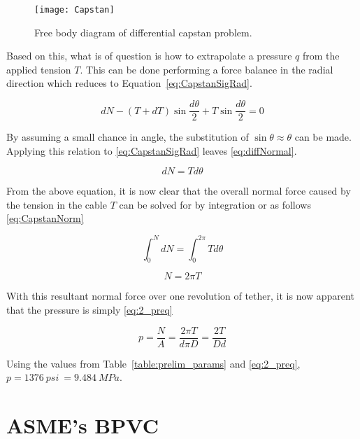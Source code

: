 \begin{figure}[!htbp]
	\centering
	\texttt{[image: Capstan]}
	\caption{Free body diagram of differential capstan problem.}
	\label{fig:Capstan}
\end{figure}

Based on this, what is of question is how to extrapolate a pressure $q$ from the applied tension $T$. This can be done performing a force balance in the radial direction which reduces to Equation~\ref{eq:CapstanSigRad}.

\begin{equation}
	\label{eq:CapstanSigRad}
	dN-(T+dT)\sin \frac{d\theta}{2}+T\sin \frac{d\theta}{2}= 0
\end{equation}

By assuming a small chance in angle, the substitution of $\sin \theta \approx \theta$ can be made. Applying this relation to \ref{eq:CapstanSigRad} leaves \ref{eq:diffNormal}.

\begin{equation}
	\label{eq:diffNormal}
	dN = T d\theta
\end{equation}

From the above equation, it is now clear that the overall normal force caused by the tension in the cable $T$ can be solved for by integration or as follows \ref{eq:CapstanNorm}

\begin{equation}
	\int_0^N dN =\int_0^{2\pi} T d\theta
\end{equation}

\begin{equation}
	\label{eq:CapstanNorm}
	N=2\pi T	
\end{equation}

With this resultant normal force over one revolution of tether, it is now apparent that the pressure is simply \ref{eq:2_preq}

\begin{equation}
	\label{eq:2_preq}
	p=\frac{N}{A}=\frac{2\pi T}{d\pi D}=\frac{2T}{Dd}
\end{equation}

Using the values from Table~\ref{table:prelim_params} and \ref{eq:2_preq}, $p=1376\  psi\ = 9.484\  MPa$. 

\section{ASME's BPVC}

